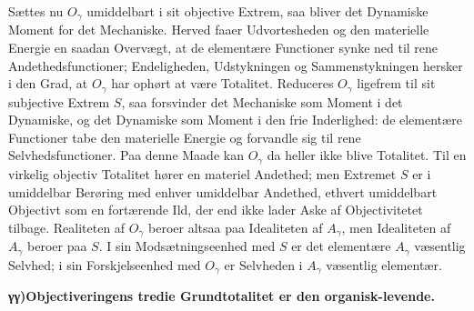 \documentclass[12pt]{book}
\newcommand{\opage}[1]{\marginnote{\footnotesize\textit{[#1]}}}
\begin{document}
Sættes nu $O_\gamma$ umiddelbart i sit objective Extrem, saa bliver det Dynamiske Moment for det
Mechaniske. Herved faaer Udvortesheden og den materielle Energie en saadan Overvægt, at de elementære
Functioner synke ned til rene Andethedsfunctioner; Endeligheden, Udstykningen og Sammenstykningen
hersker i den Grad, at $O_\gamma$ har ophørt at være Totalitet. Reduceres $O_\gamma$ ligefrem til sit
subjective Extrem $S$, saa forsvinder det Mechaniske som Moment i det Dynamiske, og det Dynamiske som
Moment i den frie Inderlighed: de elementære Functioner tabe den materielle Energie og forvandle sig
til rene Selvhedsfunctioner. Paa denne Maade kan $O_\gamma$ da heller ikke blive Totalitet. Til en
virkelig objectiv Totalitet hører en materiel Andethed; men Extremet $S$ er i
\opage{441} umiddelbar Berøring med enhver umiddelbar Andethed, ethvert umiddelbart Objectivt som en fortærende
Ild, der end ikke lader Aske af Objectivitetet tilbage. Realiteten af $O_\gamma$ beroer altsaa paa
Idealiteten af $A_\gamma$, men Idealiteten af $A_\gamma$ beroer paa $S$. I sin Modsætningseenhed med
$S$ er det elementære $A_\gamma$ væsentlig Selvhed; i sin Forskjelseenhed med $O_\gamma$ er Selvheden i
$A_\gamma$ væsentlig elementær.

\begin{center}{\bfseries γγ)\quad Objectiveringens tredie Grundtotalitet er den organisk-levende.}\end{center}
\end{document}
